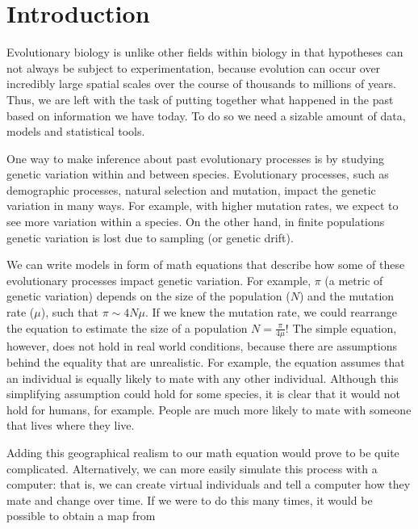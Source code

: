 \chapter{Introduction}

Evolutionary biology is unlike other fields within biology in that hypotheses can not always be subject to experimentation,
because evolution can occur over incredibly large spatial scales over the course of thousands to millions of years.
Thus, we are left with the task of putting together what happened in the past based on information we have today.
To do so we need a sizable amount of data, models and statistical tools.

One way to make inference about past evolutionary processes is by studying genetic variation within and between species.
Evolutionary processes, such as demographic processes, natural selection and mutation, impact the genetic variation in many ways.
For example, with higher mutation rates, we expect to see more variation within a species.
On the other hand, in finite populations genetic variation is lost due to sampling (or genetic drift).

We can write models in form of math equations that describe how some of these evolutionary processes impact genetic variation.
For example, $\pi$ (a metric of genetic variation) depends on the size of the population ($N$) and the mutation rate ($\mu$), such that $\pi \sim 4N\mu$.
If we knew the mutation rate, we could rearrange the equation to estimate the size of a population $N = \frac{\pi}{4\mu}$!
The simple equation, however, does not hold in real world conditions, because there are assumptions behind the equality that are unrealistic.
For example, the equation assumes that an individual is equally likely to mate with any other individual.
Although this simplifying assumption could hold for some species, it is clear that it would not hold for humans, for example.
People are much more likely to mate with someone that lives where they live.

Adding this geographical realism to our math equation would prove to be quite complicated.
Alternatively, we can more easily simulate this process with a computer:
that is, we can create virtual individuals and tell a computer how they mate and change over time.
If we were to do this many times, it would be possible to obtain a map from 



